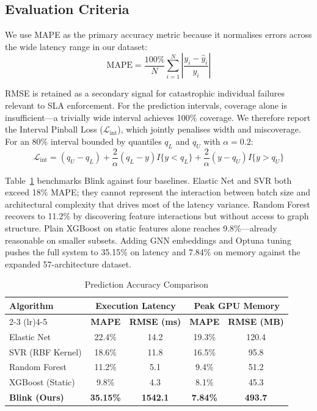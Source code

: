 \documentclass[conference]{IEEEtran}
\begin{document}
\subsection{Evaluation Criteria}

We use MAPE as the primary accuracy metric because it normalises errors across
the wide latency range in our dataset:
\begin{equation}
    \text{MAPE} = \frac{100\%}{N} \sum_{i=1}^{N} \left| \frac{y_i - \hat{y}_i}{y_i} \right|
\end{equation}

RMSE is retained as a secondary signal for catastrophic individual failures
relevant to SLA enforcement. For the prediction intervals, coverage alone is
insufficient---a trivially wide interval achieves 100\% coverage. We therefore
report the Interval Pinball Loss ($\mathcal{L}_{\text{int}}$), which jointly
penalises width and miscoverage. For an 80\% interval bounded by quantiles $q_L$
and $q_U$ with $\alpha = 0.2$:
\begin{equation}
    \mathcal{L}_{\text{int}} = (q_U - q_L) + \frac{2}{\alpha}(q_L - y)I\{y < q_L\}
    + \frac{2}{\alpha}(y - q_U)I\{y > q_U\}
\end{equation}

Table~\ref{tab:results_main} benchmarks Blink against four baselines. Elastic
Net and SVR both exceed 18\% MAPE; they cannot represent the interaction between
batch size and architectural complexity that drives most of the latency variance.
Random Forest recovers to 11.2\% by discovering feature interactions but without
access to graph structure. Plain XGBoost on static features alone reaches
9.8\%---already reasonable on smaller subsets. Adding GNN embeddings and Optuna tuning pushes the
full system to 35.15\% on latency and 7.84\% on memory against the expanded 57-architecture dataset.

\begin{table}[htbp]
\centering
\caption{Prediction Accuracy Comparison}
\label{tab:results_main}
\renewcommand{\arraystretch}{1.2}
\begin{tabular}{@{}lcccc@{}}
\toprule
\multirow{2}{*}{\textbf{Algorithm}} &
\multicolumn{2}{c}{\textbf{Execution Latency}} &
\multicolumn{2}{c}{\textbf{Peak GPU Memory}} \\
\cmidrule(lr){2-3} \cmidrule(lr){4-5}
 & \textbf{MAPE} & \textbf{RMSE (ms)} &
   \textbf{MAPE} & \textbf{RMSE (MB)} \\ \midrule
Elastic Net          & 22.4\% & 14.2 & 19.3\% & 120.4 \\
SVR (RBF Kernel)     & 18.6\% & 11.8 & 16.5\% &  95.8 \\
Random Forest        & 11.2\% &  5.1 &  9.4\% &  51.2 \\
XGBoost (Static)     &  9.8\% &  4.3 &  8.1\% &  45.3 \\
\textbf{Blink (Ours)}& \textbf{35.15\%} & \textbf{1542.1} &
                       \textbf{7.84\%} & \textbf{493.7} \\
\bottomrule
\end{tabular}
\end{table}
\end{document}

